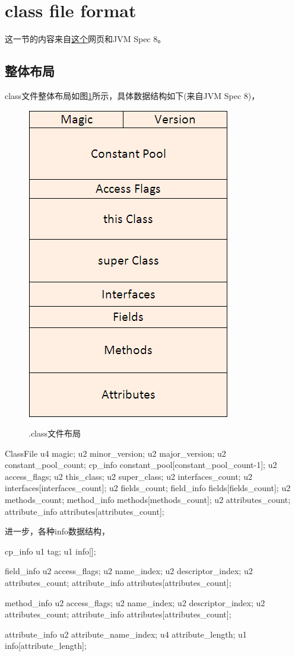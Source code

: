 ﻿\section[class file format]{class file format}
这一节的内容来自\href{http://hxraid.iteye.com/blog/687660}{这个}网页和JVM Spec 8。

\subsection[整体布局]{整体布局}
class文件整体布局如图\ref{fig:dotclass}所示，具体数据结构如下(来自JVM Spec 8)，

\begin{figure}
  \centering
  \includegraphics[width=.4\textwidth]{picturedir/JavaClassFileLayout.png}\\
  \caption{.class文件布局}\label{fig:dotclass}
\end{figure}

\begin{javacode}
ClassFile {
  u4 magic;
  u2 minor_version;
  u2 major_version;
  u2 constant_pool_count;
  cp_info constant_pool[constant_pool_count-1];
  u2 access_flags;
  u2 this_class;
  u2 super_class;
  u2 interfaces_count;
  u2 interfaces[interfaces_count];
  u2 fields_count;
  field_info fields[fields_count];
  u2 methods_count;
  method_info methods[methods_count];
  u2 attributes_count;
  attribute_info attributes[attributes_count];
}
\end{javacode}

进一步，各种info数据结构，

\begin{javacode}
cp_info {
  u1 tag;
  u1 info[];
}

field_info {
  u2 access_flags;
  u2 name_index;
  u2 descriptor_index;
  u2 attributes_count;
  attribute_info attributes[attributes_count];
}

method_info {
  u2 access_flags;
  u2 name_index;
  u2 descriptor_index;
  u2 attributes_count;
  attribute_info attributes[attributes_count];
}

attribute_info {
  u2 attribute_name_index;
  u4 attribute_length;
  u1 info[attribute_length];
}
\end{javacode}

